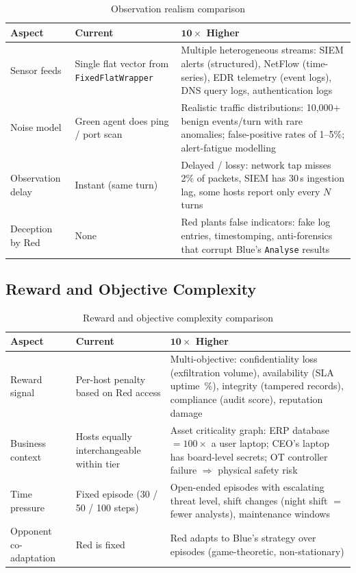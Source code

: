 \documentclass[11pt,a4paper]{article}
\begin{document}
\begin{table}[h!]
\centering
\caption{Observation realism comparison}
\label{tab:obs}
\begin{tabularx}{\textwidth}{@{} l X X @{}}
\toprule
\textbf{Aspect} & \textbf{Current} & \textbf{$\mathbf{10\times}$ Higher} \\
\midrule
Sensor feeds & Single flat vector from \texttt{FixedFlatWrapper} &
    Multiple heterogeneous streams: SIEM alerts (structured), NetFlow
    (time-series), EDR telemetry (event logs), DNS query logs,
    authentication logs \\[3pt]
Noise model & Green agent does ping / port scan &
    Realistic traffic distributions: 10,000+ benign events/turn with rare
    anomalies; false-positive rates of 1--5\%; alert-fatigue modelling \\[3pt]
Observation delay & Instant (same turn) &
    Delayed / lossy: network tap misses 2\% of packets, SIEM has 30\,s
    ingestion lag, some hosts report only every $N$ turns \\[3pt]
Deception by Red & None &
    Red plants false indicators: fake log entries, timestomping,
    anti-forensics that corrupt Blue's \texttt{Analyse} results \\
\bottomrule
\end{tabularx}
\end{table}

\subsection{Reward and Objective Complexity}

\begin{table}[h!]
\centering
\caption{Reward and objective complexity comparison}
\label{tab:reward}
\begin{tabularx}{\textwidth}{@{} l X X @{}}
\toprule
\textbf{Aspect} & \textbf{Current} & \textbf{$\mathbf{10\times}$ Higher} \\
\midrule
Reward signal & Per-host penalty based on Red access &
    Multi-objective: confidentiality loss (exfiltration volume), availability
    (SLA uptime~\%), integrity (tampered records), compliance (audit score),
    reputation damage \\[3pt]
Business context & Hosts equally interchangeable within tier &
    Asset criticality graph: ERP database $= 100\times$ a user laptop;
    CEO's laptop has board-level secrets; OT controller failure $\Rightarrow$
    physical safety risk \\[3pt]
Time pressure & Fixed episode (30 / 50 / 100 steps) &
    Open-ended episodes with escalating threat level, shift changes
    (night shift $=$ fewer analysts), maintenance windows \\[3pt]
Opponent co-adaptation & Red is fixed &
    Red adapts to Blue's strategy over episodes (game-theoretic,
    non-stationary) \\
\bottomrule
\end{tabularx}
\end{table}
\end{document}
